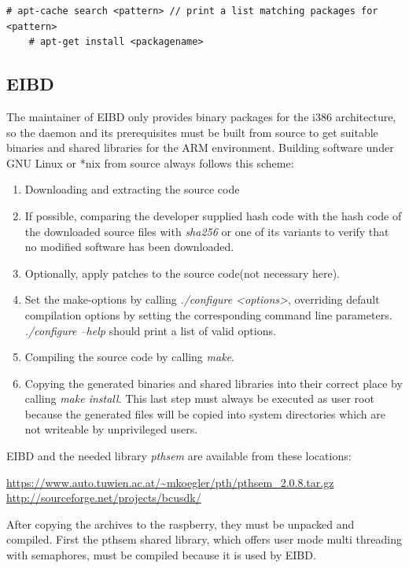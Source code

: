 \begin{lstlisting}[style=BashInputStyle]
    # apt-cache search <pattern> // print a list matching packages for <pattern> 
    # apt-get install <packagename>
\end{lstlisting}

\subsection{EIBD}

The maintainer of EIBD only provides binary packages for the i386 architecture, so the daemon and its prerequisites must be built from source to get
suitable binaries and shared libraries for the ARM environment. Building software under GNU Linux or *nix from source always follows this scheme:

\begin{enumerate}
 \item Downloading and extracting the source code
 \item If possible, comparing the developer supplied hash code  with the hash code of the downloaded source files with
 \textit{sha256} or one of its variants to verify that no modified software has been downloaded.
 \item Optionally, apply patches to the source code(not necessary here).
 \item Set the make-options by calling \textit{./configure <options>}, overriding default compilation options by setting the corresponding command line parameters.
 \textit{./configure --help} should print a list of valid options.
 \item Compiling the source code by calling \textit{make}.
 \item Copying the generated binaries and shared libraries into their correct place by calling \textit{make install}. This last step must always be executed
 as user root because the generated files will be copied into system directories which are not writeable by unprivileged users.
\end{enumerate}

EIBD and the needed library \textit{pthsem} are available from these locations:

\url{https://www.auto.tuwien.ac.at/~mkoegler/pth/pthsem_2.0.8.tar.gz}
\url{http://sourceforge.net/projects/bcusdk/}

After copying the archives to the raspberry, they must be unpacked and compiled. First the pthsem shared library, which offers user mode multi
threading with semaphores, must be compiled because it is used by EIBD. 

